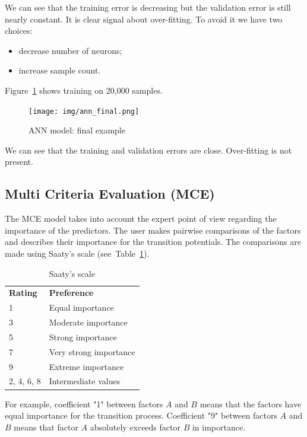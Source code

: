 \documentclass{report}
\begin{document}
We can see that the training error is decreasing but the validation error is still nearly constant. It is clear signal about over-fitting.
To avoid it we have two choices:
\begin{itemize}
    \item decrease number of neurons;
    \item increase sample count.
\end{itemize}

Figure~\ref{fig:ann_final} shows training on 20,000 samples.

\begin{figure}[h!]
\centering
\texttt{[image: img/ann\_final.png]}
\caption{ANN model: final example}
\label{fig:ann_final}
\end{figure}

We can see that the training and validation errors are close. Over-fitting is not present.

\subsection{Multi Criteria Evaluation (MCE)}

The MCE model \cite{eastman1999multi} takes into account the expert point of view regarding the importance of the predictors. 
The user makes pairwise comparisons of the factors and describes their importance for the transition potentials. 
The comparisons are made using Saaty's scale (see~Table~\ref{tab:saaty_scale}).

\begin{table}
\centering
\caption{Saaty's scale}
\begin{tabular}{ll}
 \bf{Rating} & \bf{Preference}   \\
 1 & Equal importance  \\
 3 & Moderate importance \\ 
 5 & Strong importance \\
 7 & Very strong importance \\
 9 & Extreme importance \\
 2, 4, 6, 8 & Intermediate values 
\end{tabular}
\label{tab:saaty_scale}
\end{table}

For example, coefficient "1" between factors $A$ and $B$ means that the factors have equal importance for the transition process. 
Coefficient "9" between factors $A$ and $B$ means that factor $A$ absolutely exceeds factor $B$ in importance.
\end{document}
